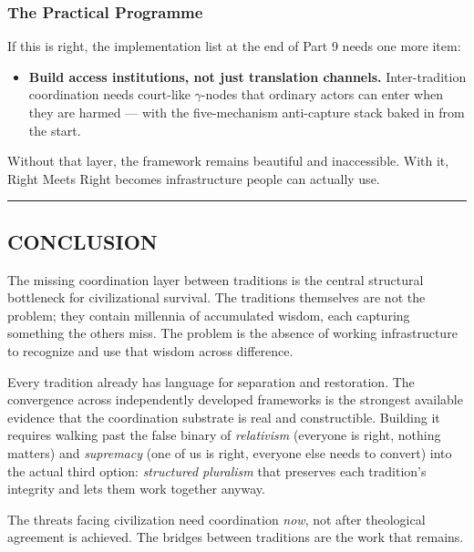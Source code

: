 \documentclass[
]{article}
\providecommand{\tightlist}{%
  \setlength{\itemsep}{0pt}\setlength{\parskip}{0pt}}
\begin{document}
\subsubsection{The Practical
Programme}\label{the-practical-programme}

If this is right, the implementation list at the end of Part 9 needs
one more item:

\begin{itemize}
\tightlist
\item
  \textbf{Build access institutions, not just translation
  channels.} Inter-tradition coordination needs court-like
  \(\gamma\)-nodes that ordinary actors can enter when they are harmed
  --- with the five-mechanism anti-capture stack baked in from
  the start.
\end{itemize}

Without that layer, the framework remains beautiful and
inaccessible. With it, Right Meets Right becomes infrastructure
people can actually use.

\begin{center}\rule{0.5\linewidth}{0.5pt}\end{center}

\subsection{CONCLUSION}\label{conclusion}

The missing coordination layer between traditions is the central
structural bottleneck for civilizational survival. The traditions
themselves are not the problem; they contain millennia of accumulated
wisdom, each capturing something the others miss. The problem is the
absence of working infrastructure to recognize and use that wisdom
across difference.

Every tradition already has language for separation and restoration. The
convergence across independently developed frameworks is the strongest
available evidence that the coordination substrate is real and
constructible. Building it requires walking past the false binary of
\emph{relativism} (everyone is right, nothing matters) and
\emph{supremacy} (one of us is right, everyone else needs to convert)
into the actual third option: \emph{structured pluralism} that preserves
each tradition's integrity and lets them work together anyway.

The threats facing civilization need coordination \emph{now}, not after
theological agreement is achieved. The bridges between traditions are
the work that remains.
\end{document}
